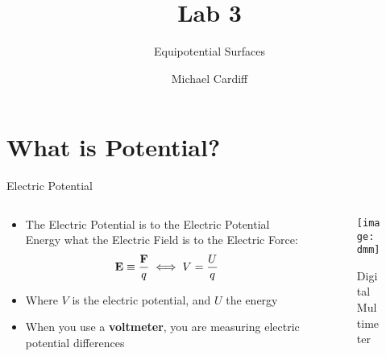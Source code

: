 \documentclass{beamer}
\title{Lab 3}
\author{Michael Cardiff}
\subtitle{Equipotential Surfaces}
\begin{document}
\begin{frame}
  \titlepage
\end{frame}

\section{What is Potential?}
\begin{frame}{Electric Potential}
  \begin{columns}
    \begin{column}{0.5\textwidth}
      \begin{itemize}
      \item The Electric Potential is to the Electric Potential Energy what the Electric Field is to the Electric Force:
        \begin{align*}
          \vb{E}\equiv\frac{\vb{F}}{q}\iff V=\frac{U}{q}
        \end{align*}
      \item Where $V$ is the electric potential, and $U$ the energy
      \item When you use a \textbf{voltmeter}, you are measuring electric potential differences
      \end{itemize}
    \end{column}
    \begin{column}{0.5\textwidth}
      \begin{figure}[H]
        \centering
        \texttt{[image: dmm]}
        \caption{Digital Multimeter}
      \end{figure}
    \end{column}
  \end{columns}
\end{frame}
\end{document}
